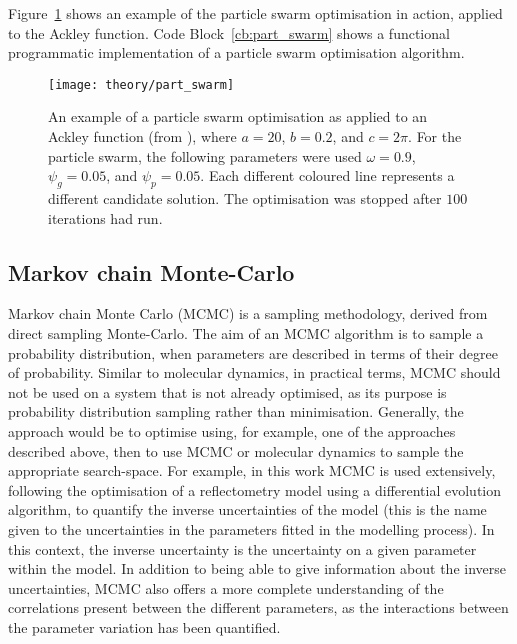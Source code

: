 Figure~\ref{fig:part_swarm} shows an example of the particle swarm optimisation in action, applied to the Ackley function.\autocite{ackley_connectionist_1987} Code Block~\ref{cb:part_swarm} shows a functional programmatic implementation of a particle swarm optimisation algorithm.
%
\begin{figure}
    \centering
    \texttt{[image: theory/part\_swarm]}
    \caption{An example of a particle swarm optimisation as applied to an Ackley function (from \cite{ackley_connectionist_1987}), where $a=20$, $b=0.2$, and $c=2\pi$. For the particle swarm, the following parameters were used $\omega=0.9$, $\psi_g=0.05$, and $\psi_p=0.05$. Each different coloured line represents a different candidate solution. The optimisation was stopped after $100$ iterations had run.}
    \label{fig:part_swarm}
\end{figure}
%
\begin{figure}
    \centering
        
\end{figure}
%

\subsection{Markov chain Monte-Carlo}
\label{sec:mcmc}
Markov chain Monte Carlo (MCMC) is a sampling methodology, derived from direct sampling Monte-Carlo.\autocite{krauth_statistical_2006}
The aim of an MCMC algorithm is to sample a probability distribution, when parameters are described in terms of their degree of probability.\autocite{sivia_data_2006}
Similar to molecular dynamics, in practical terms, MCMC should not be used on a system that is not already optimised, as its purpose is probability distribution sampling rather than minimisation.
Generally, the approach would be to optimise using, for example, one of the approaches described above, then to use MCMC or molecular dynamics to sample the appropriate search-space.
For example, in this work MCMC is used extensively, following the optimisation of a reflectometry model using a differential evolution algorithm, to quantify the inverse uncertainties of the model (this is the name given to the uncertainties in the parameters fitted in the modelling process).
In this context, the inverse uncertainty is the uncertainty on a given parameter within the model.
In addition to being able to give information about the inverse uncertainties, MCMC also offers a more complete understanding of the correlations present between the different parameters,\autocite{gilks_markov_1995} as the interactions between the parameter variation has been quantified.

